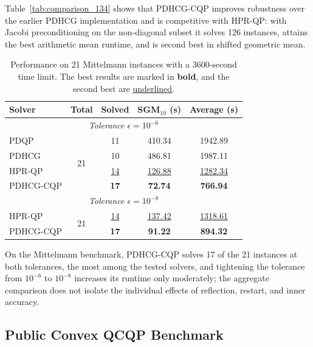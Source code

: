 \documentclass[letterpaper]{article} %
\newcommand{\name}{PDHCG-CQP\xspace}
\theoremstyle{definition}
\theoremstyle{remark}
\newcommand{\papertablesetup}{\small\setstretch{1.0}\renewcommand{\arraystretch}{1.2}}
\begin{document}
Table~\ref{tab:comparison_134} shows that \name improves robustness over
the earlier PDHCG implementation and is competitive with HPR-QP: with Jacobi
preconditioning on the non-diagonal subset it solves 126 instances, attains
the best arithmetic mean runtime, and is second best in shifted geometric
mean.

\begin{table}[htbp]
  \centering
  \papertablesetup
  \caption{Performance on 21 Mittelmann instances with a 3600-second time
  limit. The best results are marked in \textbf{bold}, and the second best are
  \underline{underlined}.}
  \label{tab:solver_comparison_21}
  \medskip
  \begin{tabular}{lcccc}
    \toprule
    \textbf{Solver} & \textbf{Total} & \textbf{Solved} & \textbf{SGM$_{10}$ (s)} & \textbf{Average (s)} \\
    \midrule
    \multicolumn{5}{c}{\textit{Tolerance $\epsilon = 10^{-6}$}} \\
    \midrule
    PDQP & \multirow{4}{*}{21} & 11 & 410.34 & 1942.89 \\
    PDHCG & & 10 & 486.81 & 1987.11 \\
    HPR-QP & & \underline{14} & \underline{126.88} & \underline{1282.34} \\
    \name & & \textbf{17} & \textbf{72.74} & \textbf{766.94} \\
    \midrule
    \multicolumn{5}{c}{\textit{Tolerance $\epsilon = 10^{-8}$}} \\
    \midrule
    HPR-QP & \multirow{2}{*}{21} & \underline{14} & \underline{137.42} & \underline{1318.61} \\
    \name & & \textbf{17} & \textbf{91.22} & \textbf{894.32} \\
    \bottomrule
  \end{tabular}
\end{table}

On the Mittelmann benchmark, \name solves 17 of the 21 instances at both
tolerances, the most among the tested solvers, and tightening the tolerance
from $10^{-6}$ to $10^{-8}$ increases its runtime only moderately; the
aggregate comparison does not isolate the individual effects of reflection,
restart, and inner accuracy.

\subsection{Public Convex QCQP Benchmark}
\label{sec:qcqp-exp}
\end{document}
